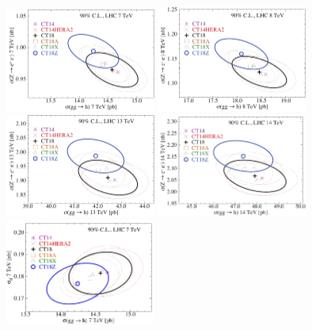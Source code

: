\begin{figure}[p]
	\begin{center}
  \includegraphics[width=0.44\textwidth]{./fig/sec6/cor_tel_ct18s_H-Z__7TeV_shifted_KP_ect.pdf}
  \includegraphics[width=0.44\textwidth]{./fig/sec6/cor_tel_ct18s_H-Z__8TeV_shifted_KP_ect.pdf} \\
  \includegraphics[width=0.44\textwidth]{./fig/sec6/cor_tel_ct18s_H-Z_13TeV_shifted_KP_ect.pdf}
  \includegraphics[width=0.44\textwidth]{./fig/sec6/cor_tel_ct18s_H-Z_14TeV_shifted_KP_ect.pdf} \\
  \includegraphics[width=0.44\textwidth]{./fig/sec6/cor_tel_ct18s_H-T__7TeV.pdf}

\end{center}
\end{figure}

